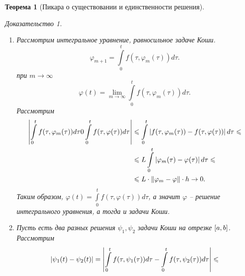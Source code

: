 \documentclass[a5paper, 10pt]{article}
\theoremstyle{definition}
\theoremstyle{plain}
\newtheorem{Th}{Теорема}
\theoremstyle{remark}
\newtheorem*{Proof}{Доказательство}
\begin{document}
\begin{Th}[Пикара о существовании и единственности решения]
\begin{Proof}
\begin{enumerate}
			При $m=0$: 
			\[
			\hm{\varphi_0(t) - \varphi_k(t)} = \hm{\int\limits_0^t f(\tau, \varphi_{k-1}(t))d\tau} \leqslant t \cdot \|f\|.
			\]
			Пусть при некотором $m$ утверждение верно, докажем для $m+1$
			\[
			\begin{split}
			\hm{\varphi_{m+1}(t) - \varphi_{m+1+k}(t)} &= \hm{\int\limits_0^t f(\tau, \varphi_{m}(t))d\tau - \int\limits_0^t f(\tau, \varphi_{m+k}(\tau))d\tau} \leqslant \\
			&\leqslant \int\limits_0^t \hm{f(\tau, \varphi_{m}(t))d\tau - f(\tau, \varphi_{m+k}(\tau))d\tau} \boxed{\leqslant}
			\end{split} 
			\]
			Так как у нас есть локальная Липшицевость, то можем найти на компакте, а именно на нашем брусе, $L$, что
			\[
			\begin{split}
			& \boxed{\leqslant} \int\limits_0^t L \cdot \hm{\varphi_m(\tau) - \varphi_{m+k}(\tau)}d\tau \leqslant \frac{\|f\|L^{m+1}}{(m+1)!}\int\limits_0^t\tau^{m+1}d\tau = \\
			&= \frac{\|f\|L^{m+1}}{(m+2)!}t^{m+2}.
			\end{split}
			\]
			Таким образом, по Критерию Коши, есть $\varphi\in C(\hs{0,h})$, что $\varphi_m \underset{m\to\infty}{\rightrightarrows} \varphi$.
			\item Рассмотрим интегральное уравнение, равносильное задаче Коши. 
			\[
			\varphi_{m+1} = \int\limits_0^t f(\tau, \varphi_m(\tau))d\tau.
			\]
			при $m\to\infty$
			\[
			\varphi(t) = \lim\limits_{m\to\infty} \int\limits_0^t f(\tau, \varphi_m(\tau))d\tau.
			\]
			Рассмотрим 
			\[
			\begin{split}
				\left|\int\limits_0^t f(\tau, \varphi_m(\tau))d\tau 0 \int\limits_0^t f(\tau, \varphi(\tau))d\tau\right| &\leqslant \int\limits_0^t \left|f(\tau, \varphi_m(\tau)) - f(\tau, \varphi(\tau))\right|d\tau \leqslant \\
				& \leqslant L\int\limits_0^t \left|\varphi_m(\tau) - \varphi(\tau)\right|d\tau \leqslant\\
				&\leqslant L \cdot \|\varphi_m - \varphi\| \cdot h \rightarrow 0.
			\end{split}
			\]
			Таким образом, $\varphi(t) = \int\limits_0^t f(\tau, \varphi(\tau))d\tau$, а значит $\varphi$ -- решение интегрального уравнения, а тогда и задачи Коши.
			\item Пусть есть два разных решения $\psi_1, \psi_2$ задачи Коши на отрезке $\left[a,b\right]$.
			Рассмотрим 
			\[
			\begin{split}
			\hm{\psi_1(t) - \psi_2(t)} &= \hm{\int\limits_0^t f(\tau, \psi_1(\tau))d\tau - \int\limits_0^t f(\tau, \psi_2(\tau))d\tau} \leqslant \\

\end{split}\]
\end{enumerate}
\end{Proof}
\end{Th}
\end{document}
